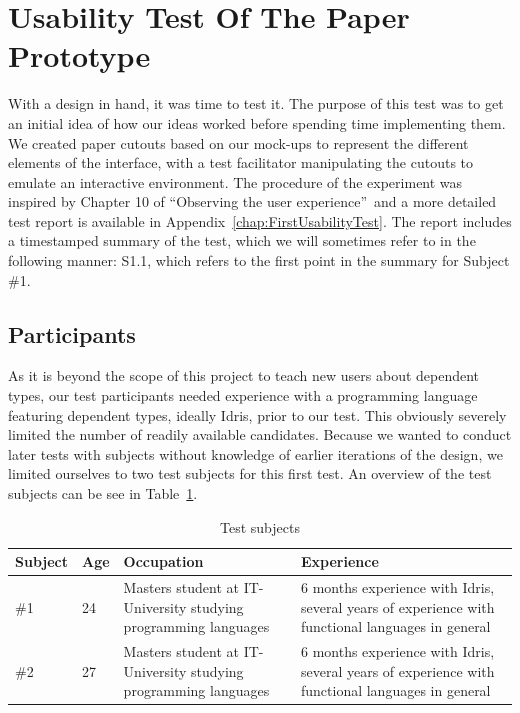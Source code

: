 \section{Usability Test Of The Paper Prototype}
\label{sec:UsabilityTest}
With a design in hand, it was time to test it. The purpose of this test was to
get an initial idea of how our ideas worked before spending time implementing
them. We created paper cutouts based on our mock-ups to represent the different
elements of the interface, with a test facilitator manipulating the cutouts to
emulate an interactive environment. The procedure of the experiment was inspired by Chapter 10 of ``Observing the user experience''\,\cite{kuniavsky2003observing} and a more detailed test report is available in Appendix~\ref{chap:FirstUsabilityTest}. The report includes a timestamped summary of the test, which we
will sometimes refer to in the following manner: S1.1, which refers to the
first point in the summary for Subject \#1.

\subsection{Participants}
As it is beyond the scope of this project to teach new users about dependent
types, our test participants needed experience with a programming language
featuring dependent types, ideally Idris, prior to our test. This obviously
severely limited the number of readily available candidates. Because we wanted
to conduct later tests with subjects without knowledge of earlier iterations of
the design, we limited ourselves to two test subjects for this first test. An
overview of the test subjects can be see in Table~\ref{table:first_test_subjects}.

\begin{table}
\centering
\begin{tabular}{| l | l | p{5cm} | p{5cm} |}
\hline
Subject & Age & Occupation & Experience \\ \hline
\#1 & 24 & Masters student at IT-University studying programming languages & 6 months experience with Idris, several years of experience with functional languages in general \\ \hline
\#2 & 27 & Masters student at IT-University studying programming languages & 6 months experience with Idris, several years of experience with functional languages in general \\ \hline
\end{tabular}
\caption{Test subjects}
\label{table:first_test_subjects}
\end{table}

